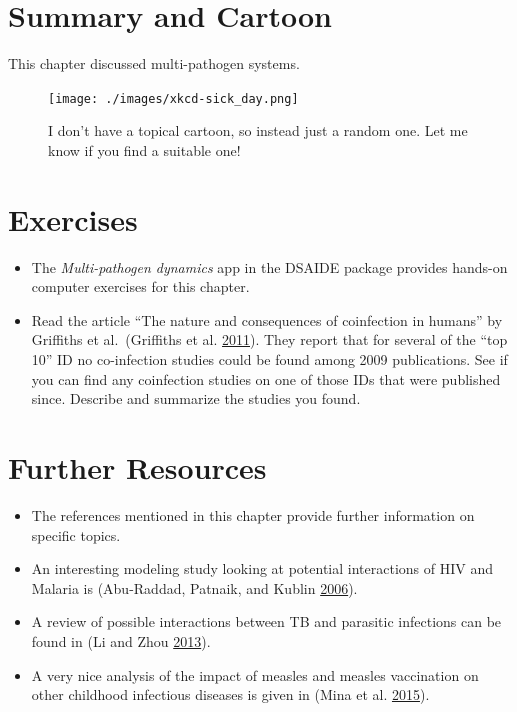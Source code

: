 \documentclass[
]{book}
\providecommand{\tightlist}{%
  \setlength{\itemsep}{0pt}\setlength{\parskip}{0pt}}
\begin{document}
\hypertarget{summary-and-cartoon-11}{%
\section{Summary and Cartoon}\label{summary-and-cartoon-11}}

This chapter discussed multi-pathogen systems.

\begin{figure}
\centering
\texttt{[image: ./images/xkcd-sick\_day.png]}
\caption{I don't have a topical cartoon, so instead just a random one. Let me know if you find a suitable one!}
\end{figure}

\hypertarget{exercises-11}{%
\section{Exercises}\label{exercises-11}}

\begin{itemize}
\tightlist
\item
  The \emph{Multi-pathogen dynamics} app in the DSAIDE package provides hands-on computer exercises for this chapter.
\item
  Read the article ``The nature and consequences of coinfection in humans'' by Griffiths et al.~(Griffiths et al. \protect\hyperlink{ref-griffiths11}{2011}). They report that for several of the ``top 10'' ID no co-infection studies could be found among 2009 publications. See if you can find any coinfection studies on one of those IDs that were published since. Describe and summarize the studies you found.
\end{itemize}

\hypertarget{further-resources-11}{%
\section{Further Resources}\label{further-resources-11}}

\begin{itemize}
\tightlist
\item
  The references mentioned in this chapter provide further information on specific topics.
\item
  An interesting modeling study looking at potential interactions of HIV and Malaria is (Abu-Raddad, Patnaik, and Kublin \protect\hyperlink{ref-abu-raddad06}{2006}).
\item
  A review of possible interactions between TB and parasitic infections can be found in (Li and Zhou \protect\hyperlink{ref-li13}{2013}).
\item
  A very nice analysis of the impact of measles and measles vaccination on other childhood infectious diseases is given in (Mina et al. \protect\hyperlink{ref-mina15}{2015}).
\end{itemize}
\end{document}
